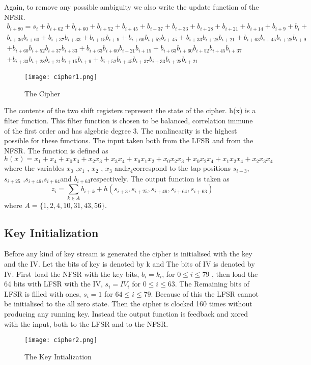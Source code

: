  Again, to remove any possible ambiguity we also write the update function of the NFSR.
\begin{multline}
	b_{i+80} = s_{i} + b_{i+62} + b_{i+60} + b_{i+52} + b_{i+45} + b_{i+37} + b_{i+33} + b_{i+28} + b_{i+21} + b_{i+14} + b_{i+9} + b_{i} +\\ b_{i+36}b_{i+60} + b_{i+37}b_{i+33} + b_{i+15}b_{i+9} + b_{i+60}b_{i+52}b_{i+45} + b_{i+33}b_{i+28}b_{i+21} + b_{i+63}b_{i+45}b_{i+28}b_{i+9}\\ + b_{i+60}b_{i+52}b_{i+37}b_{i+33} + b_{i+63}b_{i+60}b_{i+21}b_{i+15} + b_{i+63}b_{i+60}b_{i+52}b_{i+45}b_{i+37} \\+ b_{i+33}b_{i+28}b_{i+21}b_{i+15}b_{i+9} + b_{i+52}b_{i+45}b_{i+37}b_{i+33}b_{i+28}b_{i+21}
\end{multline}
\begin{figure}[h]
	\centering
	\texttt{[image: cipher1.png]}
	\caption{The Cipher}
\end{figure}
The contents of the two shift registers represent the state of the cipher. h(x) is a filter function. This filter function is chosen to be balanced, correlation immune of the first order and has algebric degree 3. The nonlinearity is the highest possible for these functions. The input taken both from the LFSR and from the NFSR. The function is defined as
\begin{equation}
	h(x) = x_1+x_4+x_{0}x_{3}+x_{2}x_{3}+x_{3}x_{4}+x_{0}x_{1}x_{2}+x_{0}x_{2}x_{3}+x_{0}x_{2}x_{4}+x_{1}x_{2}x_{4}+x_{2}x_{3}x_{4}
\end{equation}
where the variables $x_0$ ,$ x_1$ , $x_2$ , $x_3$ and$ x_4 $correspond to the tap positions $s_{i+3} $,
$s_{i+25}$ ,$ s_{i+46} $,$ s_{i+64} $and $b_{i+63} $respectively. The output function is taken as
\begin{equation}
	z_i = \sum_{k \in A}b_{i+k}+h(s_{i+3},s_{i+25},s_{i+46},s_{i+64},s_{i+63})
\end{equation}
where $A =\{1,2,4,10,31,43,56\}$.
\subsection{ Key Initialization}
Before any kind of key stream is generated the cipher is initialised with the key and the IV. Let the bits of key is denoted by k and The bits of IV is denoted by IV. First load the NFSR with the key bits, $b_i = k_i$, for $0 \leq i \leq 79$ , then load the 64 bits with LFSR with the IV, $s_i = IV_i$ for $0 \leq i \leq 63$. The Remaining bits of LFSR is filled with ones, $s_i=1$ for $64 \leq i \leq 79$. Because of this the LFSR cannot be initialised to the all zero state. Then the cipher is clocked 160 times without producing any running key. Instead the output function is feedback and xored with the input, both to the LFSR and to the NFSR. 
\begin{figure}[h]
	\centering
	\texttt{[image: cipher2.png]}
	\caption{The Key Intialization}
\end{figure}

